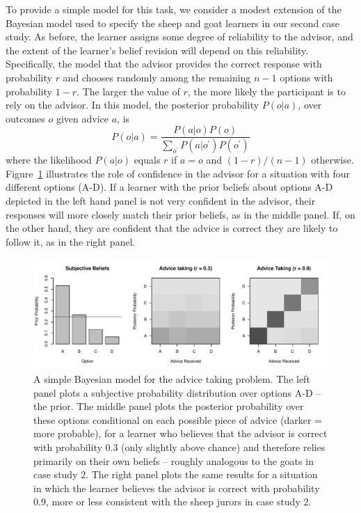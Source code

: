 \documentclass[doc]{apa6}
\begin{document}
To provide a simple model for this task, we consider a modest extension of the Bayesian model used to specify the {\sc sheep} and {\sc goat} learners in our second case study. As before, the learner assigns some degree of reliability to the advisor, and the extent of the learner's belief revision will depend on this reliability. Specifically, the model that the advisor provides the correct response with probability $r$ and chooses randomly among the remaining $n-1$ options with probability $1-r$. The larger the value of $r$, the more likely the participant is to rely on the advisor. In this model, the posterior probability $P(o|a)$, over outcomes $o$ given advice $a$, is
$$
P(o|a) = \frac{P(a|o) P(o)}{\sum_{o^\prime} P(a|o^\prime) P(o^\prime)}
$$
where the likelihood $P(a|o)$ equals $r$ if $a=o$ and $(1-r)/(n-1)$ otherwise. Figure~\ref{advice} illustrates the role of confidence in the advisor for a situation with four different options (A-D). If a learner with the prior beliefs about options A-D depicted in the left hand panel is not very confident in the advisor, their responses will more closely match their prior beliefs, as in the middle panel. If, on the other hand, they are confident that the advice is correct they are likely to follow it, as in the right panel. 

\begin{figure}[t]
\begin{center}
\includegraphics[width=13cm]{advice.pdf}
\caption{\small{A simple Bayesian model for the advice taking problem. The left panel plots a subjective probability distribution over options A-D -- the prior. The middle panel plots the posterior probability over these options conditional on each possible piece of advice (darker = more probable), for a learner who believes that the advisor is correct with probability 0.3 (only slightly above chance) and therefore relies primarily on their own beliefs -- roughly analogous to the {\sc goats} in case study 2. The right panel plots the same results for a situation in which the learner believes the advisor is correct with probability 0.9, more or less consistent with the {\sc sheep} jurors in case study 2.}}
\label{advice}
\end{center}
\end{figure}
\end{document}
